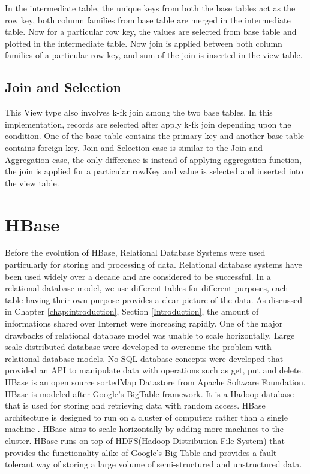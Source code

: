\documentclass[11pt,a4paper,bibtotoc,idxtotoc,headsepline,footsepline,footexclude,BCOR12mm,DIV13]{scrbook}
\begin{document}
In the intermediate table, the unique keys from both the base tables act as the row key, both column families from base table are merged in the intermediate table. Now for a particular row key, the values are selected from base table and plotted in the intermediate table. Now join is applied between both column families of a particular row key, and sum of the join is inserted in the view table.  


\subsection{Join and Selection}
This View type also involves k-fk join among the two base tables. In this implementation, records are selected after apply k-fk join depending upon the condition. One of the base table contains the primary key and another base table contains foreign key. Join and Selection case is similar to the Join and Aggregation case, the only difference is instead of applying aggregation function, the join is applied for a particular rowKey and value is selected and inserted into the view table. 

\newpage
\section{HBase}
\label{sec:hbase}

Before the evolution of HBase, Relational Database Systems were used particularly for storing and processing of data. Relational database systems have been used widely over a decade and are considered to be successful. In a relational database model, we use different tables for different purposes, each table having their own purpose provides  
a clear picture of the data. As discussed in Chapter \ref{chap:introduction}, Section \ref{Introduction}, the amount of informations shared over Internet were increasing rapidly. One of the major drawbacks of relational database model was unable to scale horizontally. Large scale distributed database were developed to overcome the problem with relational database models. No-SQL database concepts were developed that provided an API to manipulate data with operations such as get, put and delete. HBase is an open source sortedMap Datastore from Apache Software Foundation. HBase is modeled after Google's BigTable framework. It is a Hadoop database that is used for storing and retrieving data with random access. HBase architecture is designed to run on a cluster of computers rather than a single machine \cite{coprocessor:detail}. HBase aims to scale horizontally by adding more machines to the cluster. HBase runs on top of HDFS(Hadoop Distribution File System) that provides the functionality alike of Google's Big Table and provides a fault-tolerant way of storing a large volume of semi-structured and unstructured data\cite{bigdata:analysis}.
\end{document}

